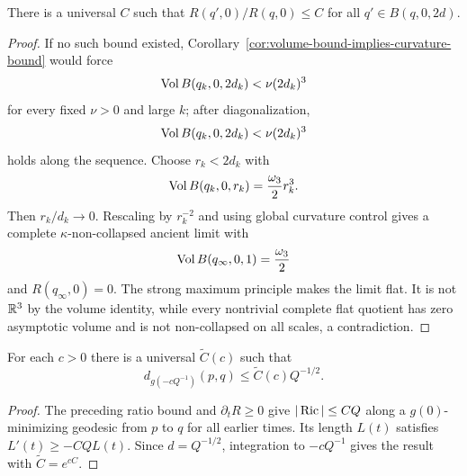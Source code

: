 \begin{claim}\label{claim:curvature-ratio-bound-near-basepoint}
\label{2Rbound}

There is a universal $C$ such that
$R(q',0)/R(q,0)\leq C$ for all $q'\in B(q,0,2d)$.
\end{claim}
\begin{proof}
\sketch If no such bound existed, Corollary~\ref{cor:volume-bound-implies-curvature-bound}
would force
\begin{equation}\label{V3}
 \operatorname{Vol} B(q_k,0,2d_k)<\nu(2d_k)^3
\end{equation}
for every fixed $\nu>0$ and large $k$; after diagonalization,
\begin{equation}\label{lowerbd}
 \operatorname{Vol} B(q_k,0,2d_k)<\nu(2d_k)^3
\end{equation}
holds along the sequence. Choose $r_k<2d_k$ with
\begin{equation}\label{V/2}
 \operatorname{Vol} B(q_k,0,r_k)=\frac{\omega_3}{2}r_k^3.
\end{equation}
Then $r_k/d_k\to0$. Rescaling by $r_k^{-2}$ and using global
curvature control gives a complete $\kappa$-non-collapsed ancient
limit with
\begin{equation}\label{V3/2}
 \operatorname{Vol} B(q_\infty,0,1)=\frac{\omega_3}{2}
\end{equation}
and $R(q_\infty,0)=0$. The strong maximum principle makes the limit
flat. It is not $\mathbb{R}^3$ by the volume identity, while every
nontrivial complete flat quotient has zero asymptotic volume and is
not non-collapsed on all scales, a contradiction.
\end{proof}

\begin{claim}\label{claim:distance-bound-under-rescaling}
For each $c>0$ there is a universal $\widetilde C(c)$ such that
\[
 d_{g(-cQ^{-1})}(p,q)\leq\widetilde C(c)Q^{-1/2}.
\]
\end{claim}
\begin{proof}
\sketch The preceding ratio bound and $\partial_tR\geq0$ give
$|\operatorname{Ric}|\leq CQ$ along a $g(0)$-minimizing geodesic from $p$ to
$q$ for all earlier times. Its length $L(t)$ satisfies
$L'(t)\geq-CQL(t)$. Since $d=Q^{-1/2}$, integration to
$-cQ^{-1}$ gives the result with $\widetilde C=e^{cC}$.
\end{proof}

